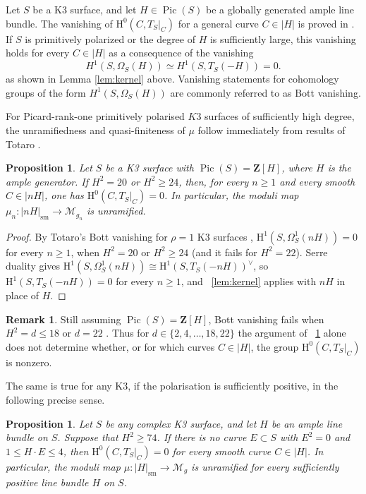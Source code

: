 \documentclass[a4paper,12pt,twoside,reqno]{amsart}
\makeatletter
\numberwithin{equation}{section}
\def\cr@pref#1:#2\@nil{#1}
\newcommand{\cr@tsing}[1]{\@nameuse{cr@map@\cr@pref#1:\@nil}}
\newcommand{\Cref}[1]{\cr@tsing{#1}~\ref{#1}}
\theoremstyle{plain}
\newtheorem{proposition}[theorem]{Proposition}
\theoremstyle{definition}
\newtheorem{remark}[theorem]{Remark}
\DeclareMathOperator{\Pic}{Pic}
\newcommand{\ZZ}{\mathbf{Z}}
\newcommand{\Om}{\Omega^1}
\newcommand{\sm}{\mathrm{sm}}
\newcommand{\Mmod}{\mathscr{M}}
\newcommand{\HH}{\mathrm{H}}
\theoremstyle{plain}
\theoremstyle{definition}
\makeatother
\begin{document}
Let $S$ be a K3 surface, and let $H \in \Pic(S)$ be a globally generated ample line bundle. The vanishing of $\HH^0(C,T_S|_C)$ for a general curve $C \in |H|$ is proved in \cite{BA,DH}. If $S$ is primitively polarized or the degree of $H$ is sufficiently large, this vanishing holds for every $C \in |H|$ as a consequence of the vanishing
\[
H^1(S,\Omega_S(H))\simeq H^1(S,T_S(-H))=0.
\]
as shown in Lemma \ref{lem:kernel} above. Vanishing statements for cohomology groups of the form $H^1(S,\Omega_S(H))$ are commonly referred to as Bott vanishing.


For Picard-rank-one primitively polarised $K3$ surfaces of sufficiently high degree, the unramifiedness and quasi-finiteness of $\mu$ follow immediately from results of Totaro \cite{Totaro}.

\begin{proposition}\label{prop:good-range}
Let $S$ be a K3 surface with $\Pic(S)=\ZZ[H]$, where $H$ is the ample generator. If $H^2=20$ or $H^2\ge24$, then, for every $n\geq1$ and every smooth $C\in|nH|$, one has $\HH^0(C,T_S|_C)=0$. In particular, the moduli map $\mu_n\colon|nH|_{\sm}\to \Mmod_{g_n}$ is unramified.
\end{proposition}



\begin{proof}
By Totaro's Bott vanishing for $\rho=1$ K3 surfaces \cite[Theorems~3.2--3.3]{Totaro}, $\HH^1(S,\Om_S(nH))=0$ for every $n\geq1$, when $H^2=20$ or $H^2\ge24$ (and it fails for $H^2=22$). Serre duality gives $\HH^1(S,\Om_S(nH))\cong \HH^1(S,T_S(-nH))^{\vee}$, so $\HH^1(S,T_S(-nH))=0$ for every $n\geq1$, and \Cref{lem:kernel} applies with $nH$ in place of $H$.
\end{proof}

\begin{remark}\label{rem:badrange}
Still assuming $\Pic(S)=\ZZ[H]$, Bott vanishing fails when
$H^2=d\le18$ or $d=22$ \cite[ Theorem 3.1 - 3.2]{Totaro}. Thus for
$d\in\{2,4,\dots,18,22\}$ the argument of
\Cref{prop:good-range} alone does not determine whether, or for which
curves $C\in|H|$, the group $\HH^0(C,T_S|_C)$ is nonzero.
\end{remark}

The same is true for any K3, if the polarisation is sufficiently positive, in the following precise sense.

\begin{proposition}\label{prop:good-range2}
Let $S$ be any complex K3 surface, and let $H$ be an ample line bundle on $S$. Suppose that $H^2 \geq 74$. If there is no curve $E \subset S$ with $E^2=0$ and $1 \leq H \cdot E \leq 4$, then $\HH^0(C,T_S|_C)=0$ for every smooth curve $C\in|H|$. In particular, the moduli map $\mu\colon|H|_{\sm}\to \Mmod_g$ is unramified for every sufficiently positive line bundle $H$ on $S$.
\end{proposition}
\end{document}

